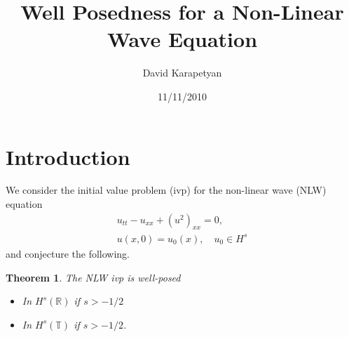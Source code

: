 \documentclass[12pt,reqno]{amsart}
\numberwithin{equation}{section}  %
\numberwithin{figure}{section}
\newcommand{\rr}{\mathbb{R}}
\newcommand{\ci}{\mathbb{T}}
\theoremstyle{plain}
\newtheorem{theorem}{Theorem}
\theoremstyle{definition}
\theoremstyle{remark}
\begin{document}
\title{Well Posedness for a Non-Linear Wave Equation}
\author{David Karapetyan}
\address{Department of Mathematics  \\
    University  of Notre Dame\\
        Notre Dame, IN 46556 }
        \date{11/11/2010}
        \maketitle
        \section{Introduction}
        \label{sec:intro}
        We consider the initial value problem (ivp) for the non-linear wave
        (NLW) equation 
        \begin{gather}
          u_{tt} - u_{xx} + (u^2)_{xx} = 0,
          \label{eqn:nlw}
          \\
          u(x,0) = u_{0}(x), \quad u_{0} \in H^{s}
          \label{eqn:nlw-init-data}
        \end{gather}
        and conjecture the following.
        \begin{theorem}
        The NLW ivp is well-posed
        \begin{itemize}
          \item In $H^s(\rr)$ if $s > -1/2$
          \item In $H^{s}(\ci)$ if $s > -1/2$.
          \end{itemize}
        \label{thm:wp}
        \end{theorem}
        
        
        
        
        

        
\end{document}

